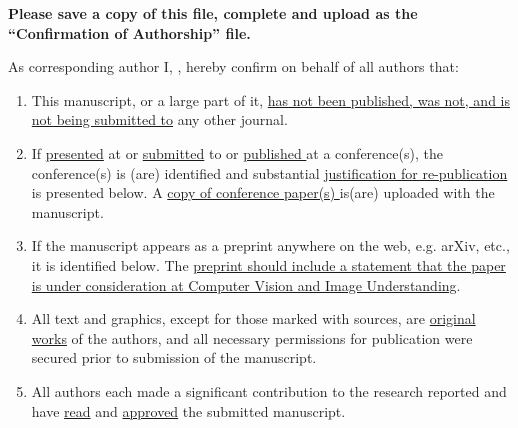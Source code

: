 \documentclass[times,referee,twocolumn,final,authoryear]{elsarticle}
\begin{document}
\thispagestyle{empty}
                                                             
\begin{table}[!th]

\begin{minipage}{.9\textwidth}
\baselineskip12pt
\ifpreprint
  \vspace*{1pc}
\else
  \vspace*{-6pc}
\fi

\vskip6pt


\vskip1pc


{\bf Please save a copy of this file, complete and upload as the 
``Confirmation of Authorship'' file.}

\vskip1pc

As corresponding author 
I, \underline{\hphantom{\hspace*{7cm}}}, 
hereby confirm on behalf of all authors that:

\vskip1pc

\begin{enumerate}
\itemsep=3pt
\item This manuscript, or a large part of it, \underline {has not been
published,  was not, and is not being submitted to} any other journal. 

\item If \underline {presented} at or \underline {submitted} to or
\underline  {published }at a conference(s), the conference(s) is (are)
identified and  substantial \underline {justification for
re-publication} is presented  below. A \underline {copy of
conference paper(s) }is(are) uploaded with the  manuscript.

\item If the manuscript appears as a preprint anywhere on the web, e.g.
arXiv,  etc., it is identified below. The \underline {preprint should
include a  statement that the paper is under consideration at Computer Vision and Image Understanding}.

\item All text and graphics, except for those marked with sources, are
\underline  {original works} of the authors, and all necessary
permissions for  publication were secured prior to submission of the
manuscript.

\item All authors each made a significant contribution to the research
reported  and have \underline {read} and \underline {approved} the
submitted  manuscript. 
\end{enumerate}


\end{minipage}
\end{table}
\end{document}
